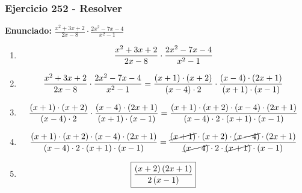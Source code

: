 \documentclass[11pt,a4paper]{article}
\newcommand{\fitmath}[1]{%
\[
\setbox0=\hbox{$\displaystyle #1$}%
\ifdim\wd0>\linewidth
\resizebox{\linewidth}{!}{$\displaystyle #1$}%
\else
#1%
\fi
\]
}
\begin{document}
\subsubsection*{Ejercicio 252 - Resolver}
\textbf{Enunciado:} $ \frac{x^{2} + 3 x + 2}{2 x - 8} \cdot \frac{2 x^{2} - 7 x - 4}{x^{2} - 1} $\par
\begin{enumerate}[leftmargin=2em]
\item \fitmath{\frac{x^{2} + 3 x + 2}{2 x - 8} \cdot \frac{2 x^{2} - 7 x - 4}{x^{2} - 1}}
\item \fitmath{\frac{x^{2} + 3 x + 2}{2 x - 8} \cdot \frac{2 x^{2} - 7 x - 4}{x^{2} - 1}= \frac{\left(x + 1\right)\cdot \left(x + 2\right)}{\left(x - 4\right)\cdot 2} \cdot \frac{\left(x - 4\right)\cdot \left(2 x + 1\right)}{\left(x + 1\right)\cdot \left(x - 1\right)}}
\item \fitmath{\frac{\left(x + 1\right)\cdot \left(x + 2\right)}{\left(x - 4\right)\cdot 2}\cdot \frac{\left(x - 4\right)\cdot \left(2 x + 1\right)}{\left(x + 1\right)\cdot \left(x - 1\right)}= \frac{\left(x + 1\right)\cdot \left(x + 2\right)\cdot \left(x - 4\right)\cdot \left(2 x + 1\right)}{\left(x - 4\right)\cdot 2\cdot \left(x + 1\right)\cdot \left(x - 1\right)}}
\item \fitmath{\frac{\left(x + 1\right)\cdot \left(x + 2\right)\cdot \left(x - 4\right)\cdot \left(2 x + 1\right)}{\left(x - 4\right)\cdot 2\cdot \left(x + 1\right)\cdot \left(x - 1\right)}= \frac{\cancel{\left(x + 1\right)}\cdot \left(x + 2\right)\cdot \cancel{\left(x - 4\right)}\cdot \left(2 x + 1\right)}{\cancel{\left(x - 4\right)}\cdot 2\cdot \cancel{\left(x + 1\right)}\cdot \left(x - 1\right)}}
\item \fitmath{\boxed{\frac{\left(x + 2\right) \left(2 x + 1\right)}{2 \left(x - 1\right)}}}
\end{enumerate}

\vspace{0.12cm}
\end{document}
